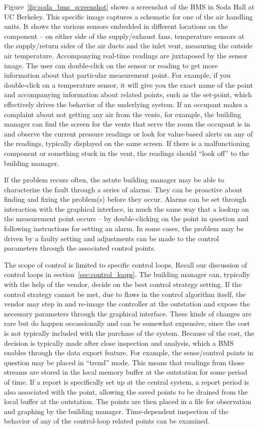 Figure~\ref{fig:soda_bms_screenshot} shows a screenshot of the BMS in Soda Hall at UC Berkeley.  This specific image
captures a schematic for one of the air handling units.  It shows the various sensors embedded in different locations
on the component -- on either side of the supply/exhaust fans, temperature sensors at the supply/return sides of the
air ducts and the inlet vent, measuring the outside air temperature.  Accompanying real-time readings are juxtaposed
by the sensor image.  The user can double-click on the sensor or reading to get more information about that particular 
measurement point.  For example, if you double-click on a temperature sensor, it will give you the exact name of the 
point and accompanying information about related points, such as the set-point, which effectively drives the behavior of 
the underlying system.  If an occupant makes a complaint about not getting any air from the vents, for example, the 
building manager can find the screen for the vents that serve the room the occupant is in and observe the current
pressure readings or look for value-based alerts on any of the readings, typically displayed on the same screen.
If there is a malfunctioning component or something stuck in the vent, the readings should ``look off'' to the building 
manager.

If the problem recurs often, the astute building manager may be able to characterize the fault through a series of alarms.
They can be proactive about finding and fixing the problem(s) before they occur.  Alarms can be set through interaction
with the graphical interface, in much the same way that a lookup on the measurement point occurs -- by double-clicking on 
the point in question and following instructions for setting an alarm.  In some cases, the problem may be driven 
by a faulty setting and adjustments can be made to the control parameters through the associated control points.

The scope of control is limited to specific control loops.  Recall our discussion of control loops in section~\ref{sec:control_loops}.
The building manager can, typically with the help of the vendor, decide on the best control strategy setting.  If the control
strategy cannot be met, due to flaws in the control algorithm itself, the vendor may step in and re-image the controller
at the outstation and expose the necessary parameters through the graphical interface.  These kinds of changes are rare
but do happen occassionally and can be somewhat expensive, since the cost is not typically included with the purchase
of the system.  Because of the cost, the decision is typically made after close inspection and analysis, which a BMS
enables through the data export feature.  
For example, the sense/control points in question may be placed in ``trend'' mode.  This means that readings
from those streams are stored in the local memory buffer at the outstation for some period of time.  If a report is specifically
set up at the central system, a report period is also associated with the point, allowing the saved points to be drained
from the local buffer at the outstation.  The points are then placed in a file for observation and graphing by the 
building manager.  Time-dependent inspection of the behavior of any of the control-loop related points can be examined.

